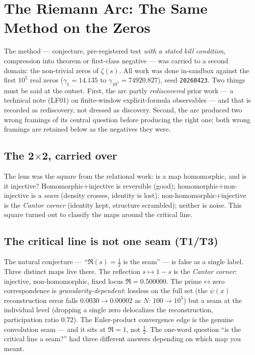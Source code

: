 \documentclass[11pt,a4paper]{article}
\newcommand{\seed}{\texttt{20260423}}
\newcommand{\TT}{\textsf{T1}}
\newcommand{\Th}{\textsf{T3}}
\theoremstyle{definition}
\theoremstyle{plain}
\begin{document}
\section{The Riemann Arc: The Same Method on the Zeros}\label{sec:riemann}

The method --- conjecture, pre-registered test \emph{with a stated kill condition}, compression
into theorem or first-class negative --- was carried to a second domain: the non-trivial zeros of
$\zeta(s)$. All work was done in-sandbox against the first $10^5$ real zeros ($\gamma_1=14.135$ to
$\gamma_{10^5}=74920.827$), seed \seed. Two things must be said at the outset. First, the arc
partly \emph{rediscovered} prior work --- a technical note (\textsf{LF01}) on finite-window
explicit-formula observables --- and that is recorded as rediscovery, not dressed as discovery.
Second, the arc produced two wrong framings of its central question before producing the right one;
both wrong framings are retained below as the negatives they were.

\subsection{The 2$\times$2, carried over}
The lens was the square from the relational work: is a map homomorphic, and is it injective?
Homomorphic$+$injective is reversible (good); homomorphic$+$non-injective is a \emph{seam} (density
crosses, identity is lost); non-homomorphic$+$injective is the \emph{Cantor corner} (identity kept,
structure scrambled); neither is noise. This square turned out to classify the maps around the
critical line.

\subsection{The critical line is not one seam (\TT/\Th)}
The natural conjecture --- ``$\Re(s)=\tfrac12$ is the seam'' --- is false as a single label. Three
distinct maps live there. The reflection $s\mapsto 1-s$ is the \emph{Cantor corner}: injective,
non-homomorphic, fixed locus $\Re=0.500000$. The prime$\leftrightarrow$zero correspondence is
\emph{granularity-dependent}: lossless on the full set (the $\psi(x)$ reconstruction error falls
$0.0030\to0.00002$ as $N{:}\,100\to10^5$) but a seam at the individual level (dropping a single
zero delocalizes the reconstruction, participation ratio $0.72$). The Euler-product convergence
edge is the genuine convolution seam --- and it sits at $\Re=1$, not $\tfrac12$. The one-word
question ``is the critical line a seam?'' had three different answers depending on which map you
meant.
\end{document}
